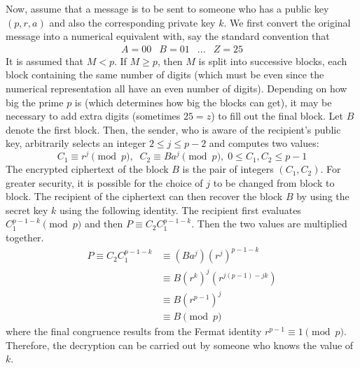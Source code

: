 \documentclass{article}
\begin{document}
Now, assume that a message is to be sent to someone who has a public key $(p, r, a)$ and also the corresponding private key $k$. We first convert the original message into a numerical equivalent with, say the standard convention that 
\begin{equation}
  \begin{array}{cccc}
      A = 00 & B = 01 & ... & Z = 25
  \end{array}
\end{equation}
It is assumed that $M<p$. If $M \geq p$, then $M$ is split into successive blocks, each block containing the same number of digits (which must be even since the numerical representation all have an even number of digits). Depending on how big the prime $p$ is (which determines how big the blocks can get), it may be necessary to add extra digits (sometimes $25 = z$) to fill out the final block. Let $B$ denote the first block. Then, the sender, who is aware of the recipient's public key, arbitrarily selects an integer $2 \leq j \leq p-2$ and computes two values: 
\begin{equation}
  C_1 \equiv r^j \pmod{p}, \;\; C_2 \equiv Ba^j \pmod{p}, \; 0 \leq C_1, C_2 \leq p-1
\end{equation}
The encrypted ciphertext of the block $B$ is the pair of integers $(C_1, C_2)$. For greater security, it is possible for the choice of $j$ to be changed from block to block. The recipient of the ciphertext can then recover the block $B$ by using the secret key $k$ using the following identity. The recipient first evaluates $C_1^{p-1-k} \pmod{p}$ and then $P \equiv C_2 C_1^{p-1-k}$. Then the two values are multiplied together. 
\begin{align*}
    P \equiv C_2 C_1^{p-1-k} & \equiv (Ba^j)(r^j)^{p-1-k} \\
    & \equiv B (r^k)^j (r^{j(p-1) - jk}) \\
    & \equiv B(r^{p-1})^j \\
    & \equiv B \pmod{p}
\end{align*}
where the final congruence results from the Fermat identity $r^{p-1} \equiv 1 \pmod{p}$. Therefore, the decryption can be carried out by someone who knows the value of $k$. 
\end{document}
